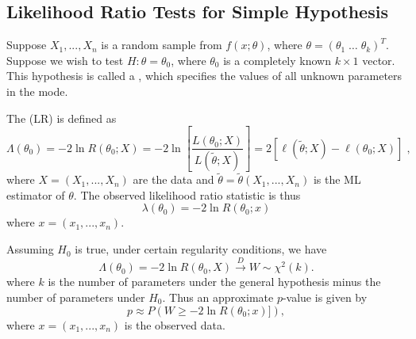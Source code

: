\documentclass[notoc,notitlepage]{tufte-book}
\newcommand{\convd}{\overset{D}{\to}}
\begin{document}

\subsection{Likelihood Ratio Tests for Simple Hypothesis}%
\label{sub:likelihood_ratio_tests_for_simple_hypothesis}

\begin{defn}
\label{defn:simple_hypothesis}
  Suppose $X_1, ..., X_n$ is a random sample from $f(x; \theta)$, where $\theta = (\theta_1 \; \hdots \; \theta_k)^T$. Suppose we wish to test $H : \theta = \theta_0$, where $\theta_0$ is a completely known $k \times 1$ vector. This hypothesis is called a , which specifies the values of all unknown parameters in the mode.
\end{defn}

\begin{defn}
\label{defn:likelihood_ratio_statistic}
The  (LR)  is defined as
\begin{equation*}
  \Lambda(\theta_0) = -2 \ln R(\theta_0; X) = -2 \ln \left[ \frac{L(\theta_0; X)}{L(\tilde{\theta}; X)} \right] = 2 \left[ \ell(\tilde{\theta}; X) - \ell(\theta_0; X) \right] \; ,
\end{equation*}
where $X = (X_1, ..., X_n)$ are the data and $\tilde{\theta} = \tilde{\theta}(X_1, ..., X_n)$ is the ML estimator of $\theta$. The observed likelihood ratio statistic is thus
\begin{equation*}
  \lambda(\theta_0) = - 2 \ln R(\theta_0; x)
\end{equation*}
where $x = (x_1, ..., x_n)$.
\end{defn}

Assuming $H_0$ is true, under certain regularity conditions, we have
\begin{equation*}
  \Lambda(\theta_0) = -2 \ln R(\theta_0, X) \convd W \sim \chi^2(k).
\end{equation*}
where $k$ is the number of parameters under the general hypothesis minus the number of parameters under $H_0$. Thus an approximate $p$-value is given by
\begin{equation*}
  p \approx P\left(W \geq -2 \ln R(\theta_0; x)]\right),
\end{equation*}
where $x = (x_1, ..., x_n)$ is the observed data.
\end{document}
